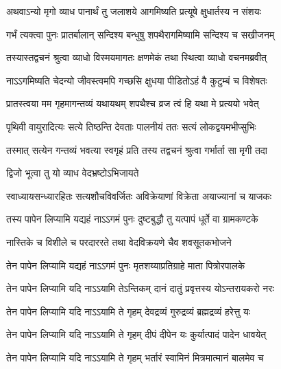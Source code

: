 \twolineshloka
{अथवाऽन्यो मृगो व्याध पानार्थं तु जलाशये\footnotemark{}}
{आगमिष्यति प्रत्यूषे क्षुधार्तस्य न संशयः}%

\twolineshloka
{गर्भं त्यक्त्वा पुनः प्रातर्बालान् सन्दिश्य बन्धुषु}
{शपथैरागमिष्यामि सन्दिश्य च सखीजनम्}%

\twolineshloka
{तस्यास्तद्वचनं श्रुत्वा व्याधो विस्मयमागतः}
{क्षणमेकं तथा स्थित्वा व्याधो वचनमब्रवीत्}%

\twolineshloka
{नाऽऽगमिष्यति चेदन्यो जीव\footnotemark{}स्त्वमपि गच्छसि}
{क्षुधया पीडितोऽहं वै कुटुम्बं च विशेषतः}%

\twolineshloka
{प्रातस्त्वया मम गृहमागन्तव्यं यथायथम्}
{शपथैश्च व्रज त्वं हि यथा मे प्रत्ययो भवेत्}%

\twolineshloka
{पृथिवी वायुरादित्यः सत्ये तिष्ठन्ति देवताः}
{पालनीयं ततः सत्यं लोकद्वयमभीप्सुभिः}%

\twolineshloka
{तस्मात् सत्येन गन्तव्यं भवत्या स्वगृहं प्रति}
{तस्य तद्वचनं श्रुत्वा गर्भार्ता सा मृगी तदा}%



\onelineshloka
{द्विजो भूत्वा तु यो व्याध वेदभ्रष्टोऽभिजायते}%

\twolineshloka
{स्वाध्यायसन्ध्यारहितः सत्यशौचविवर्जितः}
{अविक्रेयाणां विक्रेता अयाज्यानां च याजकः}%

\twolineshloka
{\footnotemark{}तस्य पापेन लिप्यामि यद्यहं नाऽऽगमं पुनः}
{दुष्टबुद्धौ तु यत्पापं धूर्ते वा ग्रामकण्टके}%

\twolineshloka
{नास्तिके च विशीले च परदाररते तथा}
{वेदविक्रयणे चैव शवसूतकभोजने}%

\twolineshloka
{तेन पापेन लिप्यामि यद्यहं नाऽऽगमं पुनः}
{मृतशय्याप्रतिग्राहे माता पित्रोरपालके}%

\twolineshloka
{तेन पापेन लिप्यामि यदि नाऽऽयामि तेऽन्तिकम्}
{दानं दातुं प्रवृत्तस्य योऽन्तरायकरो नरः}%

\twolineshloka
{तेन पापेन लिप्यामि यदि नाऽऽयामि ते गृहम्}
{देवद्रव्यं गुरुद्रव्यं ब्रह्मद्रव्यं हरेत्तु यः}%

\twolineshloka
{तेन पापेन लिप्यामि यदि नाऽऽयामि ते गृहम्}
{दीपं दीपेन यः कुर्यात्पादं पादेन धावयेत्}%

\twolineshloka
{तेन पापेन लिप्यामि यदि नाऽऽयामि ते गृहम्}
{भर्तारं स्वामिनं मित्रमात्मानं बालमेव च}%


